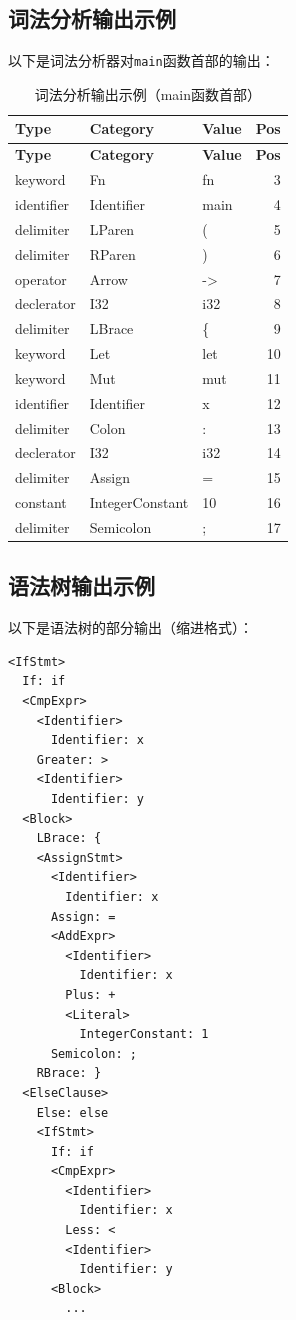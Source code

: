 \documentclass[12pt,a4paper]{ctexart}
\begin{document}
\subsection{词法分析输出示例}

以下是词法分析器对\texttt{main}函数首部的输出：

\begin{longtable}{|l|l|l|r|}
\caption{词法分析输出示例（main函数首部）} \\
\hline
\textbf{Type} & \textbf{Category} & \textbf{Value} & \textbf{Pos} \\
\hline
\endfirsthead
\hline
\textbf{Type} & \textbf{Category} & \textbf{Value} & \textbf{Pos} \\
\hline
\endhead
\hline
\endfoot
\hline
\endlastfoot

keyword & Fn & fn & 3 \\
identifier & Identifier & main & 4 \\
delimiter & LParen & ( & 5 \\
delimiter & RParen & ) & 6 \\
operator & Arrow & -> & 7 \\
declerator & I32 & i32 & 8 \\
delimiter & LBrace & \{ & 9 \\
keyword & Let & let & 10 \\
keyword & Mut & mut & 11 \\
identifier & Identifier & x & 12 \\
delimiter & Colon & : & 13 \\
declerator & I32 & i32 & 14 \\
delimiter & Assign & = & 15 \\
constant & IntegerConstant & 10 & 16 \\
delimiter & Semicolon & ; & 17 \\
\end{longtable}

\subsection{语法树输出示例}

以下是语法树的部分输出（缩进格式）：

\begin{lstlisting}[language=RustLike, caption={语法树输出示例（IfStmt节点）}]
<IfStmt>
  If: if
  <CmpExpr>
    <Identifier>
      Identifier: x
    Greater: >
    <Identifier>
      Identifier: y
  <Block>
    LBrace: {
    <AssignStmt>
      <Identifier>
        Identifier: x
      Assign: =
      <AddExpr>
        <Identifier>
          Identifier: x
        Plus: +
        <Literal>
          IntegerConstant: 1
      Semicolon: ;
    RBrace: }
  <ElseClause>
    Else: else
    <IfStmt>
      If: if
      <CmpExpr>
        <Identifier>
          Identifier: x
        Less: <
        <Identifier>
          Identifier: y
      <Block>
        ...
\end{lstlisting}
\end{document}
